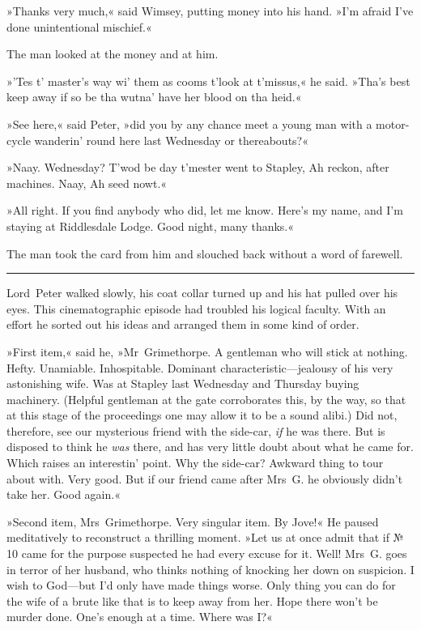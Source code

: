 »Thanks very much,« said Wimsey, putting money into his hand. »I'm afraid I've done unintentional mischief.«

The man looked at the money and at him.

»'Tes t' master's way wi' them as cooms t'look at t'missus,« he said.  »Tha's best keep away if so be tha wutna' have her blood on tha heid.«

»See here,« said Peter, »did you by any chance meet a young man with a motor-cycle wanderin' round here last Wednesday or thereabouts?«

»Naay. Wednesday? T'wod be day t'mester went to Stapley, Ah reckon, after machines. Naay, Ah seed nowt.«

»All right. If you find anybody who did, let me know. Here's my name, and I'm staying at Riddlesdale Lodge. Good night, many thanks.«

The man took the card from him and slouched back without a word of farewell.

\noindent\hfil\rule{0.5\textwidth}{.4pt}\hfil

Lord~Peter walked slowly, his coat collar turned up and his hat pulled over his eyes. This cinematographic episode had troubled his logical faculty. With an effort he sorted out his ideas and arranged them in some kind of order.

»First item,« said he, »Mr~Grimethorpe. A gentleman who will stick at nothing. Hefty. Unamiable. Inhospitable. Dominant characteristic—jealousy of his very astonishing wife. Was at Stapley last Wednesday and Thursday buying machinery. (Helpful gentleman at the gate corroborates this, by the way, so that at this stage of the proceedings one may allow it to be a sound alibi.) Did not, therefore, see our mysterious friend with the side-car, \textit{if} he was there. But is disposed to think he \textit{was} there, and has very little doubt about what he came for. Which raises an interestin' point. Why the side-car?  Awkward thing to tour about with. Very good. But if our friend came after Mrs~G. he obviously didn't take her. Good again.«

»Second item, Mrs~Grimethorpe. Very singular item. By Jove!« He paused meditatively to reconstruct a thrilling moment. »Let us at once admit that if № 10 came for the purpose suspected he had every excuse for it. Well! Mrs~G. goes in terror of her husband, who thinks nothing of knocking her down on suspicion. I wish to God—but I'd only have made things worse. Only thing you can do for the wife of a brute like that is to keep away from her. Hope there won't be murder done. One's enough at a time. Where was I?«

